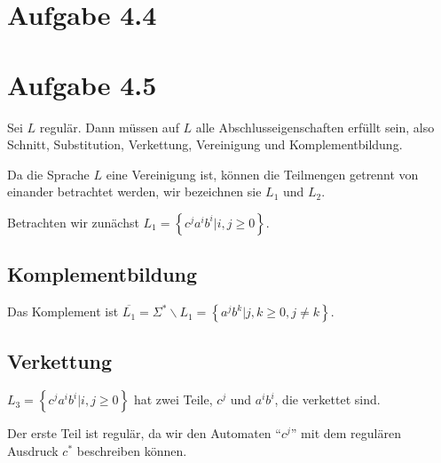 \documentclass{article}
\begin{document}
\section*{Aufgabe 4.4}



\section*{Aufgabe 4.5}
Sei $L$ regulär. Dann müssen auf $L$ alle Abschlusseigenschaften erfüllt sein, also Schnitt, Substitution, Verkettung, Vereinigung und Komplementbildung.

Da die Sprache $L$ eine Vereinigung ist, können die Teilmengen getrennt von einander betrachtet werden, wir bezeichnen sie $L_1$ und $L_2$.

Betrachten wir zunächst $L_1 = \left\{ c^ja^ib^i|i,j \geq 0 \right\}$.

\subsection*{Komplementbildung}
Das Komplement ist $\overline{L_1} = \Sigma^* \backslash L_1 = \left\{ a^jb^k | j,k \geq 0, j \neq k \right\}$.

\subsection*{Verkettung}
$L_3 = \left\{c^ja^ib^i|i,j \geq 0\right\}$ hat zwei Teile, $c^j$ und $a^ib^i$, die verkettet sind. 

\begin{center}
\end{center}

Der erste Teil ist regulär, da wir den Automaten "`$c^j$"' mit dem regulären Ausdruck $c^*$ beschreiben können. 
\end{document}
